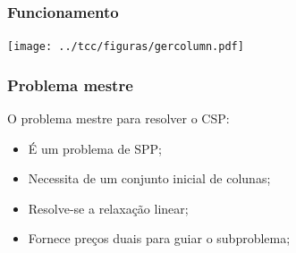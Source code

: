 \documentclass{beamer}
\begin{document}
\begin{frame}
    \frametitle{Funcionamento}

    {
        \centering
        \texttt{[image: ../tcc/figuras/gercolumn.pdf]}
        \label{treta}
    }
\end{frame}



\begin{frame}
    \frametitle{Problema mestre}

    O problema mestre para resolver o CSP:
    \begin{itemize}
        \item É um problema de SPP;
        \item Necessita de um conjunto inicial de colunas;
        \item Resolve-se a relaxação linear;
        \item Fornece preços duais para guiar o subproblema;
    \end{itemize}
\end{frame}
\end{document}
